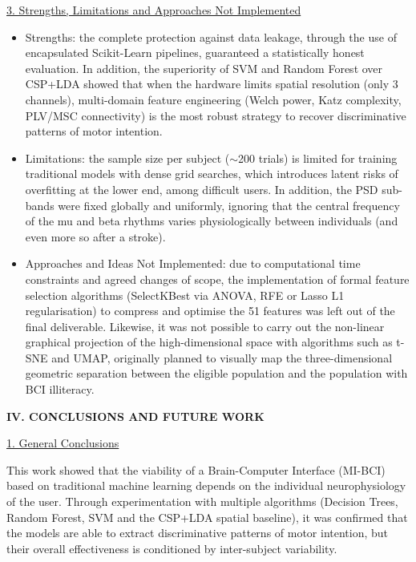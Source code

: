 \documentclass[12pt,a4paper]{article}
\newcommand{\mainsection}[1]{%
  \par\bigskip\noindent\textbf{#1}\par\nopagebreak}
\newcommand{\subheading}[1]{%
  \par\noindent\underline{#1}\par\nopagebreak}
\begin{document}
\medskip
\subheading{3. Strengths, Limitations and Approaches Not Implemented}
\begin{itemize}[label=\textbullet, leftmargin=1.3cm]
  \item Strengths: the complete protection against data leakage, through the use of encapsulated
        Scikit-Learn pipelines, guaranteed a statistically honest evaluation. In addition, the
        superiority of SVM and Random Forest over CSP+LDA showed that when the hardware limits
        spatial resolution (only 3 channels), multi-domain feature engineering (Welch power, Katz
        complexity, PLV/MSC connectivity) is the most robust strategy to recover discriminative
        patterns of motor intention.
  \item Limitations: the sample size per subject ($\sim$200 trials) is limited for training
        traditional models with dense grid searches, which introduces latent risks of
        overfitting at the lower end, among difficult users. In addition, the PSD sub-bands were
        fixed globally and uniformly, ignoring that the central frequency of the mu and beta
        rhythms varies physiologically between individuals (and even more so after a stroke).
  \item Approaches and Ideas Not Implemented: due to computational time constraints and agreed
        changes of scope, the implementation of formal feature selection algorithms (SelectKBest
        via ANOVA, RFE or Lasso L1 regularisation) to compress and optimise the 51 features was
        left out of the final deliverable. Likewise, it was not possible to carry out the
        non-linear graphical projection of the high-dimensional space with algorithms such as
        t-SNE and UMAP, originally planned to visually map the three-dimensional geometric
        separation between the eligible population and the population with BCI illiteracy.
\end{itemize}

\mainsection{IV. CONCLUSIONS AND FUTURE WORK}
\medskip
\subheading{1. General Conclusions}
This work showed that the viability of a Brain-Computer Interface (MI-BCI) based on traditional
machine learning depends on the individual neurophysiology of the user. Through experimentation
with multiple algorithms (Decision Trees, Random Forest, SVM and the CSP+LDA spatial baseline),
it was confirmed that the models are able to extract discriminative patterns of motor intention,
but their overall effectiveness is conditioned by inter-subject variability.
\end{document}
